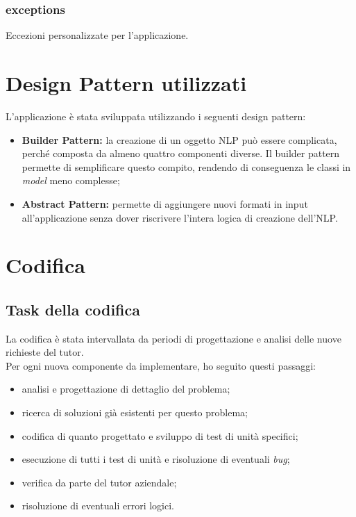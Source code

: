 \subsubsection{exceptions} %
Eccezioni personalizzate per l'applicazione.

\begin{namespacedesc}
\end{namespacedesc}

\section{Design Pattern utilizzati}
L'applicazione è stata sviluppata utilizzando i seguenti design pattern:
\begin{itemize}
    \item \textbf{Builder Pattern:} la creazione di un oggetto NLP può essere complicata, perché composta da almeno quattro componenti diverse. Il builder pattern permette di semplificare questo compito, rendendo di conseguenza le classi in \textit{model} meno complesse;
    \item \textbf{Abstract Pattern:} permette di aggiungere nuovi formati in input all'applicazione senza dover riscrivere l'intera logica di creazione dell'NLP.
\end{itemize}

\section{Codifica}\label{sec:codifica}
\subsection{Task della codifica}
La codifica è stata intervallata da periodi di progettazione e analisi delle nuove richieste del tutor.\\
Per ogni nuova componente da implementare, ho seguito questi passaggi:
\begin{itemize}
    \item analisi e progettazione di dettaglio del problema;
    \item ricerca di soluzioni già esistenti per questo problema;
    \item codifica di quanto progettato e sviluppo di test di unità specifici;
    \item esecuzione di tutti i test di unità e risoluzione di eventuali \textit{bug};
    \item verifica da parte del tutor aziendale;
    \item risoluzione di eventuali errori logici.
\end{itemize}

